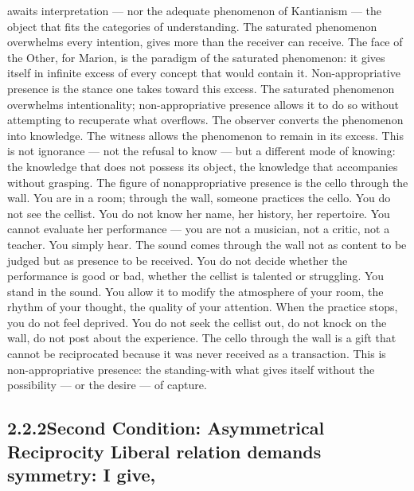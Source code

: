 awaits interpretation — nor the adequate phenomenon of Kantianism — the object that fits the categories of understanding. The saturated phenomenon overwhelms every intention, gives more than the receiver can receive. The face of the Other, for Marion, is the paradigm of the saturated phenomenon: it gives itself in infinite excess of every concept that would contain it. Non-appropriative presence is the stance one takes toward this excess. The saturated phenomenon overwhelms intentionality; non-appropriative presence allows it to do so without attempting to recuperate what overflows. The observer converts the phenomenon into knowledge. The witness allows the phenomenon to remain in its excess. This is not ignorance — not the refusal to know — but a different mode of knowing: the knowledge that does not possess its object, the knowledge that accompanies without grasping. The figure of nonappropriative presence is the cello through the wall. You are in a room; through the wall, someone practices the cello. You do not see the cellist. You do not know her name, her history, her repertoire. You cannot evaluate her performance — you are not a musician, not a critic, not a teacher. You simply hear. The sound comes through the wall not as content to be judged but as presence to be received. You do not decide whether the performance is good or bad, whether the cellist is talented or struggling. You stand in the sound. You allow it to modify the atmosphere of your room, the rhythm of your thought, the quality of your attention. When the practice stops, you do not feel deprived. You do not seek the cellist out, do not knock on the wall, do not post about the experience. The cello through the wall is a gift that cannot be reciprocated because it was never received as a transaction. This is non-appropriative presence: the standing-with what gives itself without the possibility — or the desire — of capture.

\subsection{2.2.2\quad Second Condition: Asymmetrical Reciprocity Liberal relation demands symmetry: I give,}

